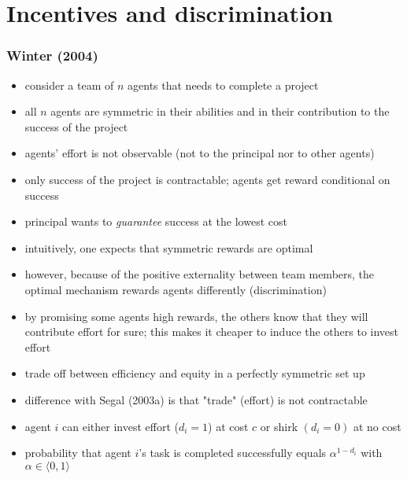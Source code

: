 \documentclass[11pt,english]{beamer}
\begin{document}
\section{Incentives and discrimination}
\label{sec-4}
\begin{frame}[allowframebreaks]\frametitle{Winter (2004)}
\label{sec-4-1}
\begin{itemize}

\item consider a team of $n$ agents that needs to complete a project\\
\label{sec-4-1-1}%
\item all $n$ agents are symmetric in their abilities and in their contribution to the success of the project\\
\label{sec-4-1-2}%
\item agents' effort is not observable (not to the principal nor to other agents)\\
\label{sec-4-1-3}%
\item only success of the project is contractable; agents get reward conditional on success\\
\label{sec-4-1-4}%
\item principal wants to \emph{guarantee} success at the lowest cost\\
\label{sec-4-1-5}%
\item intuitively, one expects that symmetric rewards are optimal\\
\label{sec-4-1-6}%
\item however, because of the positive externality between team members, the optimal mechanism rewards agents differently (discrimination)\\
\label{sec-4-1-7}%
\item by promising some agents high rewards, the others know that they will contribute effort for sure; this makes it cheaper to induce the others to invest effort\\
\label{sec-4-1-8}%
\item trade off between efficiency and equity in a perfectly symmetric set up\\
\label{sec-4-1-9}%
\item difference with Segal (2003a) is that "trade" (effort) is not contractable\\
\label{sec-4-1-10}%
\item agent $i$ can either invest effort ($d_{i}=1$) at cost $c$ or shirk $(d_{i}=0)$ at no cost\\
\label{sec-4-1-11}%
\item probability that agent $i$'s task is completed successfully equals $\alpha^{1-d_{i}}$ with $\alpha \in \langle 0,1 \rangle$\\

\end{itemize}
\end{frame}
\end{document}

